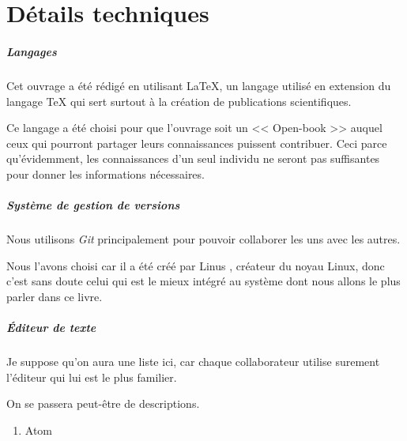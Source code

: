 \chapter{Détails techniques}

\paragraph{Langages}

Cet ouvrage a été rédigé en utilisant \LaTeX{}, un langage utilisé en extension
du langage \TeX{} qui sert surtout à la création de publications scientifiques.

Ce langage a été choisi pour que l'ouvrage soit un << Open-book >> auquel
ceux qui pourront partager leurs connaissances puissent contribuer. Ceci parce
qu'évidemment, les connaissances d'un seul individu ne seront pas suffisantes
pour donner les informations nécessaires.

\paragraph{Système de gestion de versions}

Nous utilisons \emph{Git} principalement pour pouvoir collaborer les uns avec
les autres.

Nous l'avons choisi car il a été créé par Linus , créateur du
noyau Linux, donc c'est sans doute celui qui est le mieux intégré au système
dont nous allons le plus parler dans ce livre.

\paragraph{Éditeur de texte}

Je suppose qu'on aura une liste ici, car chaque collaborateur utilise surement
l'éditeur qui lui est le plus familier.

On se passera peut-être de descriptions.

\begin{enumerate}
  \item Atom
\end{enumerate}
